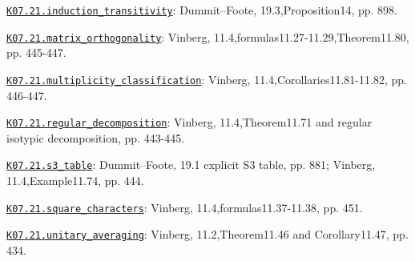 \par\smallskip\noindent\hypertarget{src:K07.21.induction_transitivity}{}\label{src:K07.21.induction_transitivity}\hyperref[K07.21.induction_transitivity]{\texttt{K07.21.induction\_transitivity}}: Dummit--Foote, 19.3,Proposition14, pp. 898.
\par\smallskip\noindent\hypertarget{src:K07.21.matrix_orthogonality}{}\label{src:K07.21.matrix_orthogonality}\hyperref[K07.21.matrix_orthogonality]{\texttt{K07.21.matrix\_orthogonality}}: Vinberg, 11.4,formulas11.27-11.29,Theorem11.80, pp. 445-447.
\par\smallskip\noindent\hypertarget{src:K07.21.multiplicity_classification}{}\label{src:K07.21.multiplicity_classification}\hyperref[K07.21.multiplicity_classification]{\texttt{K07.21.multiplicity\_classification}}: Vinberg, 11.4,Corollaries11.81-11.82, pp. 446-447.
\par\smallskip\noindent\hypertarget{src:K07.21.regular_decomposition}{}\label{src:K07.21.regular_decomposition}\hyperref[K07.21.regular_decomposition]{\texttt{K07.21.regular\_decomposition}}: Vinberg, 11.4,Theorem11.71 and regular isotypic decomposition, pp. 443-445.
\par\smallskip\noindent\hypertarget{src:K07.21.s3_table}{}\label{src:K07.21.s3_table}\hyperref[K07.21.s3_table]{\texttt{K07.21.s3\_table}}: Dummit--Foote, 19.1 explicit S3 table, pp. 881; Vinberg, 11.4,Example11.74, pp. 444.
\par\smallskip\noindent\hypertarget{src:K07.21.square_characters}{}\label{src:K07.21.square_characters}\hyperref[K07.21.square_characters]{\texttt{K07.21.square\_characters}}: Vinberg, 11.4,formulas11.37-11.38, pp. 451.
\par\smallskip\noindent\hypertarget{src:K07.21.unitary_averaging}{}\label{src:K07.21.unitary_averaging}\hyperref[K07.21.unitary_averaging]{\texttt{K07.21.unitary\_averaging}}: Vinberg, 11.2,Theorem11.46 and Corollary11.47, pp. 434.
